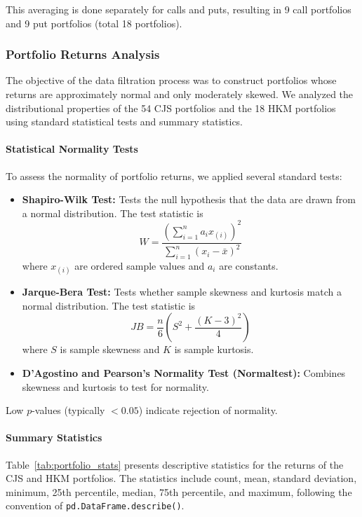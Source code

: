 \documentclass[11pt]{article}
\begin{document}
This averaging is done separately for calls and puts, resulting in 9 call portfolios and 9 put portfolios (total 18 portfolios).



\subsubsection{Portfolio Returns Analysis}

The objective of the data filtration process was to construct portfolios whose returns are approximately normal and only moderately skewed. We analyzed the distributional properties of the 54 CJS portfolios and the 18 HKM portfolios using standard statistical tests and summary statistics.

\paragraph{Statistical Normality Tests}
To assess the normality of portfolio returns, we applied several standard tests:
\begin{itemize}
  \item \textbf{Shapiro-Wilk Test:} Tests the null hypothesis that the data are drawn from a normal distribution. The test statistic is
  \[
  W = \frac{\left( \sum_{i=1}^n a_i x_{(i)} \right)^2}{\sum_{i=1}^n (x_i - \bar{x})^2}
  \]
  where $x_{(i)}$ are ordered sample values and $a_i$ are constants.
  \item \textbf{Jarque-Bera Test:} Tests whether sample skewness and kurtosis match a normal distribution. The test statistic is
  \[
  JB = \frac{n}{6} \left( S^2 + \frac{(K-3)^2}{4} \right)
  \]
  where $S$ is sample skewness and $K$ is sample kurtosis.
  \item \textbf{D'Agostino and Pearson's Normality Test (Normaltest):} Combines skewness and kurtosis to test for normality.
\end{itemize}
Low $p$-values (typically $<0.05$) indicate rejection of normality.

\paragraph{Summary Statistics}
Table~\ref{tab:portfolio_stats} presents descriptive statistics for the returns of the CJS and HKM portfolios. The statistics include count, mean, standard deviation, minimum, 25th percentile, median, 75th percentile, and maximum, following the convention of \texttt{pd.DataFrame.describe()}.
\end{document}

